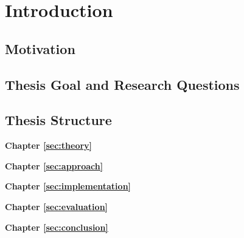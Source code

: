 %
\chapter{Introduction}
\label{sec:intro}


\section{Motivation}
\label{sec:intro:motivation}

\Blindtext[3][1] \cite{Jurgens:2000,Jurgens:1995,Miede:2011,Kohm:2011,Apple:keynote:2010,Apple:numbers:2010,Apple:pages:2010}

\section{Thesis Goal and Research Questions}
\label{sec:intro:goal}

\Blindtext[1][2]

\section{Thesis Structure}
\label{sec:intro:goal}

\textbf{Chapter \ref{sec:theory}} \\[0.2em]
\blindtext

\textbf{Chapter \ref{sec:approach}} \\[0.2em]
\blindtext

\textbf{Chapter \ref{sec:implementation}} \\[0.2em]
\blindtext

\textbf{Chapter \ref{sec:evaluation}} \\[0.2em]
\blindtext

\textbf{Chapter \ref{sec:conclusion}} \\[0.2em]
\blindtext
